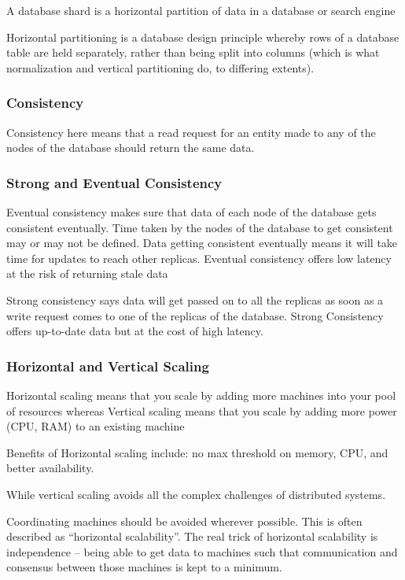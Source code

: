 \documentclass{article}
\begin{document}
    A database shard is a horizontal partition of data in a database or search engine 
    
    Horizontal partitioning is a database design principle whereby rows of a database table are held separately, rather than being split into columns (which is what normalization and vertical partitioning do, to differing extents).
    
    \subsubsection{Consistency}
    Consistency here means that a read request for an entity made to any of the nodes of the database should return the same data. 
    
    \subsubsection{Strong and Eventual Consistency}
    Eventual consistency makes sure that data of each node of the database gets consistent eventually. Time taken by the nodes of the database to get consistent may or may not be defined. Data getting consistent eventually means it will take time for updates to reach other replicas. Eventual consistency offers low latency at the risk of returning stale data
    
    Strong consistency says data will get passed on to all the replicas as soon as a write request comes to one of the replicas of the database. Strong Consistency offers up-to-date data but at the cost of high latency.
    
    \subsubsection{Horizontal and Vertical Scaling}
    Horizontal scaling means that you scale by adding more machines into your pool of resources whereas Vertical scaling means that you scale by adding more power (CPU, RAM) to an existing machine 
    
    Benefits of Horizontal scaling include: no max threshold on memory, CPU, and better availability.
    
    While vertical scaling avoids all the complex challenges of distributed systems.
    
    Coordinating machines should be avoided wherever possible. This is often described as ``horizontal scalability”. The real trick of horizontal scalability is independence – being able to get data to machines such that communication and consensus between those machines is kept to a minimum. 
    
\end{document}
